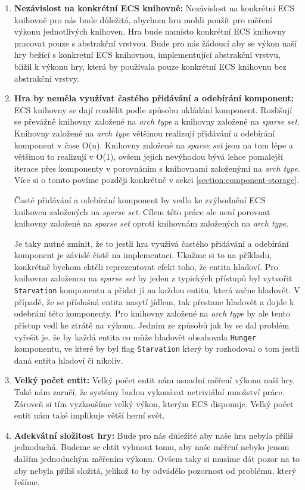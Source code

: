 \begin{enumerate}
    \item \textbf{Nezávislost na konkrétní ECS knihovně:} Nezávislost na konkrétní ECS knihovně pro nás bude důležitá, abychom hru mohli použít pro měření výkonu jednotlivých knihoven. Hra bude namísto konkrétní ECS knihovny pracovat pouze s abstrakční vrstvou. Bude pro nás žádoucí aby se výkon naší hry bežící s konkretní ECS knihovnou, implementující abstrakční vrstvu, blížil k výkonu hry, která by používala pouze konkrétní ECS knihovnu bez abstrakční vrstvy.

    \item \textbf{Hra by neměla využívat častého přidávání a odebírání komponent:} ECS knihovny se dají rozdělit podle způsobu ukládání komponent. Rozlišují se převážně knihovny založené na \textit{arch type} a knihovny založené na \textit{sparse set}. Knihovny založené na \textit{arch type} většinou realizují přidávání a odebírání komponent v čase O(n). Knihovny založené na \textit{sparse set} jsou na tom lépe a většinou to realizují v O(1), ovšem jejich nevýhodou bývá lehce pomalejší iterace přes komponenty v porovnáním s knihovnami založenými na \textit{arch type}. Více si o tomto povíme později konkrétně v sekci \ref{section:component-storage}.

    Časté přidávání a odebírání komponent by vedlo ke zvýhodnění ECS knihoven založených na \textit{sparse set}. Cílem této práce ale není porovnat knihovny založené na \textit{sparse set} oproti knihovnám založených na \textit{arch type}.

    Je taky nutné zmínit, že to jestli hra využívá častého přidávání a odebírání komponent je závislé čistě na implementaci. Ukažme si to na příkladu, konkrétně bychom chtěli reprezentovat efekt toho, že entita hladoví. Pro knihovnu založenou na \textit{sparse set} by jeden z typických přístupů byl vytvořit \verb|Starvation| komponentu a přidat jí na každou entitu, která začne hladovět. V případě, že se příslušná entita nasytí jídlem, tak přestane hladovět a dojde k odebrání této komponenty. Pro knihovny založené na \textit{arch type} by ale tento přístup vedl ke ztrátě na výkonu. Jedním ze způsobů jak by se dal problém vyřešit je, že by každá entita co může hladovět obsahovala \verb|Hunger| komponentu, ve které by byl flag \verb|Starvation| který by rozhodoval o tom jestli daná entita hladoví či nikoliv.
    
    \item \textbf{Velký počet entit:} Velký počet entit nám usnadní měření výkonu naší hry. Také nám zaručí, že systémy budou vykonávat netriviální množství práce. Zároveň si tím vyzkoušíme velký výkon, kterým ECS disponuje. Velký počet entit nám také implikuje větší herní svět.
    
    \item \textbf{Adekvátní složitost hry:} Bude pro nás důležité aby naše hra nebyla příliš jednoduchá. Budeme se chtít vyhnout tomu, aby naše měření nebylo jenom dalším jednoduchým měřením výkonu. Ovšem taky si musíme dát pozor na to aby nebyla příliš složitá, jelikož to by odvádělo pozornost od problému, který řešíme.
\end{enumerate}


